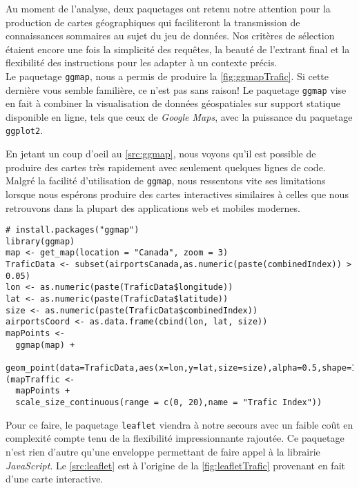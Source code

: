 Au moment de l'analyse, deux paquetages ont retenu notre attention pour la production de cartes géographiques qui faciliteront la transmission de connaissances sommaires au sujet du jeu de données. Nos critères de sélection étaient encore une fois la simplicité des requêtes, la beauté de l'extrant final et la flexibilité des instructions pour les adapter à un contexte précis. \\

Le paquetage \texttt{ggmap}, nous a permis de produire la \autoref{fig:ggmapTrafic}. Si cette dernière vous semble familière, ce n'est pas sans raison! Le paquetage \texttt{ggmap} vise en fait à combiner la visualisation de données géospatiales sur support statique disponible en ligne, tels que ceux de \emph{Google Maps}, avec la puissance du paquetage \texttt{ggplot2}. \cite{pkgR:ggmap} \\


En jetant un coup d'oeil au \autoref{src:ggmap}, nous voyons qu'il est possible de produire des cartes très rapidement avec seulement quelques lignes de code. Malgré la facilité d'utilisation de \texttt{ggmap}, nous ressentons vite ses limitations lorsque nous espérons produire des cartes interactives similaires à celles que nous retrouvons dans la plupart des applications web et mobiles modernes. \\

\begin{lstlisting}[caption = Générer une carte du trafic aérien avec \texttt{ggmap},label=src:ggmap]
# install.packages("ggmap")
library(ggmap)
map <- get_map(location = "Canada", zoom = 3)
TraficData <- subset(airportsCanada,as.numeric(paste(combinedIndex)) > 0.05)
lon <- as.numeric(paste(TraficData$longitude))
lat <- as.numeric(paste(TraficData$latitude))
size <- as.numeric(paste(TraficData$combinedIndex))
airportsCoord <- as.data.frame(cbind(lon, lat, size))
mapPoints <- 
  ggmap(map) + 
  geom_point(data=TraficData,aes(x=lon,y=lat,size=size),alpha=0.5,shape=16)
(mapTraffic <-  
  mapPoints + 
  scale_size_continuous(range = c(0, 20),name = "Trafic Index"))
\end{lstlisting}

\vspace{\baselineskip}
Pour ce faire, le paquetage \texttt{leaflet} \cite{leaflet} viendra à notre secours avec un faible coût en complexité compte tenu de la flexibilité impressionnante rajoutée. Ce paquetage n'est rien d'autre qu'une enveloppe permettant de faire appel à la librairie \emph{JavaScript}. \cite{leafletjs} Le \autoref{src:leaflet} est à l'origine de la \autoref{fig:leafletTrafic} provenant en fait d'une carte interactive. \\

